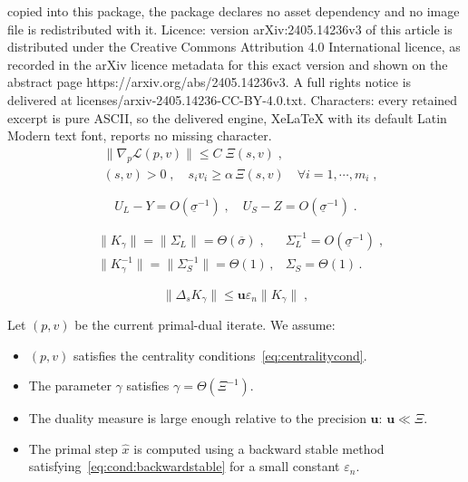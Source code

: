\documentclass[10pt,a4paper]{amsart}
\newcommand{\epstol}{\mathbf{u}}
\begin{document}
copied into this package, the package declares no asset dependency and no image file is redistributed with it. Licence: version arXiv:2405.14236v3 of this article is distributed under the Creative Commons Attribution 4.0 International licence, as recorded in the arXiv licence metadata for this exact version and shown on the abstract page https://arxiv.org/abs/2405.14236v3. A full rights notice is delivered at licenses/arxiv-2405.14236-CC-BY-4.0.txt. Characters: every retained excerpt is pure ASCII, so the delivered engine, XeLaTeX with its default Latin Modern text font, reports no missing character.
\begin{subequations}
  \label{eq:centralitycond}
  \begin{align}
    & \| \nabla_p \mathcal{L}(p, v) \| \leq C \; \Xi(s, v) \;,  \\
    \label{eq:centralitycond:complement}
    & (s, v) > 0 \;,\quad s_i v_i \geq \alpha \, \Xi(s, v) \quad \forall i =1, \cdots, m_i \; ,
  \end{align}
\end{subequations}

  \begin{equation}
    \label{eq:cond:invariantsubpsace}
    U_L - Y = O(\underline{\sigma}^{-1}) \; , \quad
    U_S - Z = O(\underline{\sigma}^{-1}) \; .
  \end{equation}

\begin{equation}
  \label{eq:cond:boundinvariantsubspace}
  \begin{aligned}
    & \| K_\gamma \| = \| \Sigma_L \| = \Theta(\overline{\sigma}) \; , &
    \Sigma_L^{-1} = O(\underline{\sigma}^{-1})  \;, \\
    & \| K_\gamma^{-1} \| = \| \Sigma_S^{-1} \| = \Theta(1) \, , &
  \Sigma_S = \Theta(1) \, .
  \end{aligned}
\end{equation}

\begin{equation}
  \label{eq:cond:backwardstable}
  \|\Delta_s K_\gamma\| \leq \epstol \varepsilon_n \|K_\gamma\| \;,
\end{equation}

\begin{assumption} Let $(p, v)$ be the current primal-dual iterate. We assume:
  \begin{itemize}
    \item[(a)] $(p, v)$ satisfies the centrality conditions~\eqref{eq:centralitycond}.
    \item[(b)] The parameter $\gamma$ satisfies $\gamma = \Theta(\Xi^{-1})$.
    \item[(c)] The duality measure is large enough relative to the precision $\epstol$: $\epstol \ll \Xi$.
    \item[(d)] The primal step $\widehat{x}$ is computed using a backward
      stable method satisfying~\eqref{eq:cond:backwardstable} for a small constant
      $\varepsilon_n$.
  \end{itemize}
  \label{hyp:cond:wellcond}
\end{assumption}
\end{document}
